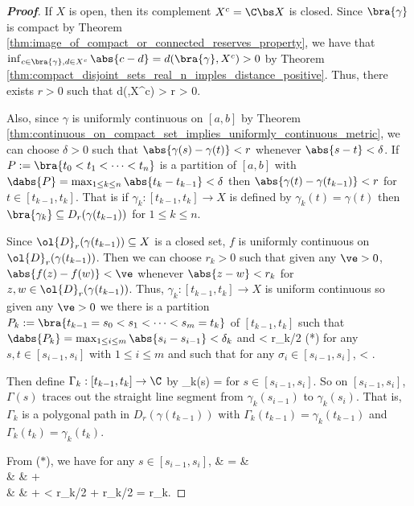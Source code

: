 \begin{proof}[\bf Proof]%
If $X$ is open, then its complement $X^c = \C\bs X$ is closed. Since $\bra{\gamma}$ is compact by Theorem \ref{thm:image_of_compact_or_connected_reserves_property}, we have that $\inf_{c\in \bra{\gamma},d\in X^c}\abs{c-d} = d(\bra{\gamma},X^c) > 0$ by Theorem \ref{thm:compact_disjoint_sets_real_n_imples_distance_positive}. Thus, there exists $r>0$ such that
\be
d(\bra{\gamma},X^c) > r > 0.
\ee

Also, since $\gamma$ is uniformly continuous on $[a,b]$ by Theorem \ref{thm:continuous_on_compact_set_implies_uniformly_continuous_metric}, we can choose $\delta>0$ such that $\abs{\gamma(s) - \gamma(t)} < r$ whenever $\abs{s-t}< \delta$. If $P:= \bra{t_0<t_1<\dots< t_n}$ is a partition of $[a,b]$ with $\dabs{P} = \max_{1\leq k\leq n}\abs{t_{k} - t_{k-1}} < \delta$ then $\abs{\gamma(t) - \gamma(t_{k-1})} < r$ for $t\in [t_{k-1},t_k]$. That is if $\gamma_k:[t_{k-1},t_k]\to X$ is defined by $\gamma_k(t) = \gamma(t)$ then $\bra{\gamma_k}\subseteq D_r(\gamma(t_{k-1})) $ for $1\leq k\leq n$.

Since $\ol{D}_r(\gamma(t_{k-1})) \subseteq X$ is a closed set, $f$ is uniformly continuous on $\ol{D}_r(\gamma(t_{k-1}))$. Then we can choose $r_k>0$ such that given any $\ve>0$, $\abs{f(z) - f(w)}<\ve$ whenever $\abs{z-w} < r_k$ for $z,w\in \ol{D}_r(\gamma(t_{k-1}))$. Thus, $\gamma_k:[t_{k-1},t_k]\to X$ is uniform continuous so given any $\ve>0$ we there is a partition $P_k := \bra{t_{k-1} = s_0< s_1 < \dots < s_m = t_k}$ of $[t_{k-1},t_k]$ such that $\dabs{P_k} = \max_{1\leq i \leq m} \abs{s_{i} - s_{i-1}} < \delta_k$ and
\be
{} < r_k/2 \qquad (*)
\ee
for any $s,t\in [s_{i-1},s_i]$ with $1\leq i\leq m$ and such that for any $\sigma_i\in [s_{i-1},s_i]$,
\be
{} < \ve.
\ee

Then define $\Gamma_k:[t_{k-1},t_k]\to \C$ by
\be
\Gamma_k(s) =  
\ee
for $s\in [s_{i-1},s_i]$. So on $[s_{i-1},s_i]$, $\Gamma(s)$ traces out the straight line segment from $\gamma_k(s_{i-1})$ to $\gamma_k(s_i)$. That is, $\Gamma_k$ is a polygonal path in $D_r(\gamma(t_{k-1}))$ with $\Gamma_k(t_{k-1}) = \gamma_k(t_{k-1})$ and $\Gamma_k(t_{k}) = \gamma_k(t_{k})$.

From ($*$), we have for any $s \in [s_{i-1},s_i]$,
\beast
{} &  = &   \\
& \leq &    +   \\
& \leq &   +  < r_k/2 + r_k/2 = r_k.
\eeast


\end{proof}
